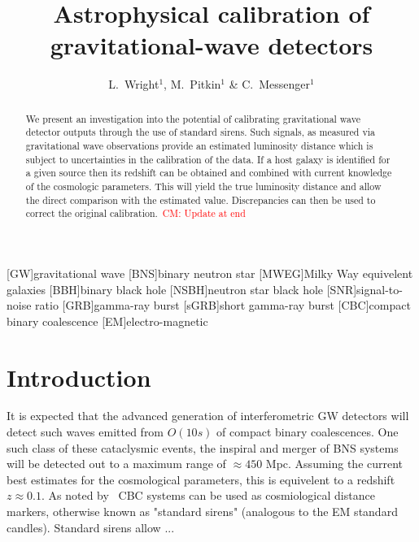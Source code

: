 \documentclass[12pt]{iopart}
\newcommand{\cm}[1]{\textcolor{red}{CM: #1}}
\begin{document}
\title{Astrophysical calibration of gravitational-wave detectors}

\author{L.~Wright$^1$, M.~Pitkin$^1$ \& C.~Messenger$^1$}
\address{$^1$ SUPA, School of Physics and Astronomy, University of
  Glasgow, Glasgow G12 8QQ, United Kingdom}

\begin{abstract}
  We present an investigation into the potential of calibrating
  gravitational wave detector outputs through the use of standard
  sirens. Such signals, as measured via gravitational wave
  observations provide an estimated luminosity distance which is
  subject to uncertainties in the calibration of the data.  If a host
  galaxy is identified for a given source then its redshift can be
  obtained and combined with current knowledge of the cosmologic
  parameters.  This will yield the true luminosity distance and allow
  the direct comparison with the estimated value.  Discrepancies can
  then be used to correct the original calibration.~\cm{Update at end}
\end{abstract}

[GW]{gravitational wave}
[BNS]{binary neutron star}
[MWEG]{Milky Way equivelent galaxies}
[BBH]{binary black hole}
[NSBH]{neutron star black hole}
[SNR]{signal-to-noise ratio}
[GRB]{gamma-ray burst}
[sGRB]{short gamma-ray burst}
[CBC]{compact binary coalescence}
[EM]{electro-magnetic}

\maketitle

\section{Introduction\label{sec:intro}}

It is expected that the advanced generation of interferometric \ac{GW}
detectors will detect such waves emitted from $O(10s)$ of compact binary
coalescences.  One such class of these cataclysmic events, the inspiral and
merger of \ac{BNS} systems will be detected out to a maximum range of $\approx
450$ Mpc. Assuming the current best estimates for the cosmological parameters,
this is equivelent to a redshift $z\approx 0.1$. As noted by~\cite{} \ac{CBC}
systems can be used as cosmiological distance markers, otherwise known as
"standard sirens" (analogous to the \ac{EM} standard candles). Standard sirens
allow ...
\end{document}
